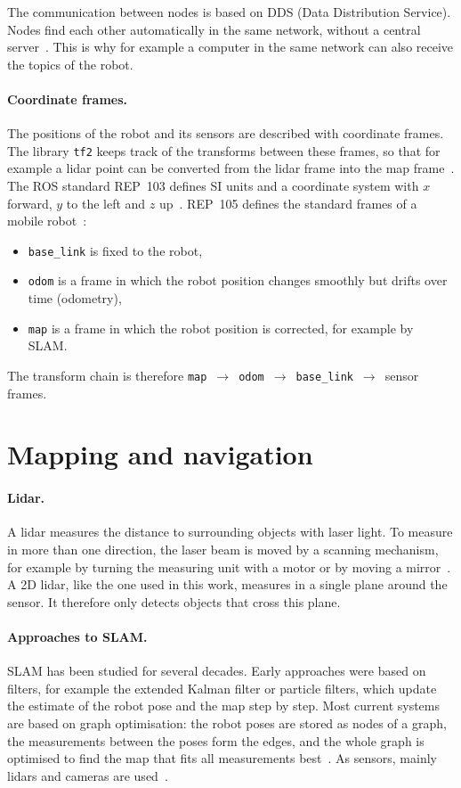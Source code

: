 The communication between nodes is based on DDS (Data Distribution Service). Nodes find each other automatically in the same network, without a central server~\citep{ros2_jazzy,albatati2026}. This is why for example a computer in the same network can also receive the topics of the robot.

\paragraph{Coordinate frames.} The positions of the robot and its sensors are described with coordinate frames. The library \texttt{tf2} keeps track of the transforms between these frames, so that for example a lidar point can be converted from the lidar frame into the map frame~\citep{ros2_jazzy}. The ROS standard REP~103 defines SI units and a coordinate system with $x$ forward, $y$ to the left and $z$ up~\citep{rep103}. REP~105 defines the standard frames of a mobile robot~\citep{rep105}:
\begin{itemize}
  \item \texttt{base\_link} is fixed to the robot,
  \item \texttt{odom} is a frame in which the robot position changes smoothly but drifts over time (odometry),
  \item \texttt{map} is a frame in which the robot position is corrected, for example by SLAM.
\end{itemize}
The transform chain is therefore \texttt{map}~$\rightarrow$~\texttt{odom}~$\rightarrow$~\texttt{base\_link}~$\rightarrow$~sensor frames.

\section{Mapping and navigation}
\label{sec:theory_slam}

\paragraph{Lidar.} A lidar measures the distance to surrounding objects with laser light. To measure in more than one direction, the laser beam is moved by a scanning mechanism, for example by turning the measuring unit with a motor or by moving a mirror~\citep{raj2020}. A 2D lidar, like the one used in this work, measures in a single plane around the sensor. It therefore only detects objects that cross this plane.

\paragraph{Approaches to SLAM.} SLAM has been studied for several decades. Early approaches were based on filters, for example the extended Kalman filter or particle filters, which update the estimate of the robot pose and the map step by step. Most current systems are based on graph optimisation: the robot poses are stored as nodes of a graph, the measurements between the poses form the edges, and the whole graph is optimised to find the map that fits all measurements best~\citep{cadena2016,grisetti2010}. As sensors, mainly lidars and cameras are used~\citep{cadena2016}.

